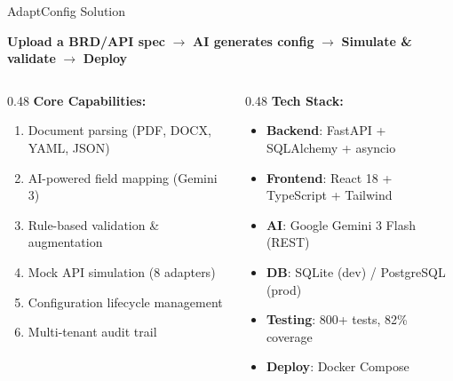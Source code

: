 \documentclass[aspectratio=169,11pt]{beamer}
\begin{document}
\begin{frame}{AdaptConfig Solution}
\begin{center}
\textbf{Upload a BRD/API spec} $\rightarrow$ \textbf{AI generates config} $\rightarrow$ \textbf{Simulate \& validate} $\rightarrow$ \textbf{Deploy}
\end{center}
\vspace{0.5em}
\begin{columns}
\begin{column}{0.48\textwidth}
\textbf{Core Capabilities:}
\begin{enumerate}
    \item Document parsing (PDF, DOCX, YAML, JSON)
    \item AI-powered field mapping (Gemini 3)
    \item Rule-based validation \& augmentation
    \item Mock API simulation (8 adapters)
    \item Configuration lifecycle management
    \item Multi-tenant audit trail
\end{enumerate}
\end{column}
\begin{column}{0.48\textwidth}
\textbf{Tech Stack:}
\begin{itemize}
    \item \textbf{Backend}: FastAPI + SQLAlchemy + asyncio
    \item \textbf{Frontend}: React 18 + TypeScript + Tailwind
    \item \textbf{AI}: Google Gemini 3 Flash (REST)
    \item \textbf{DB}: SQLite (dev) / PostgreSQL (prod)
    \item \textbf{Testing}: 800+ tests, 82\% coverage
    \item \textbf{Deploy}: Docker Compose
\end{itemize}
\end{column}
\end{columns}
\end{frame}
\end{document}
